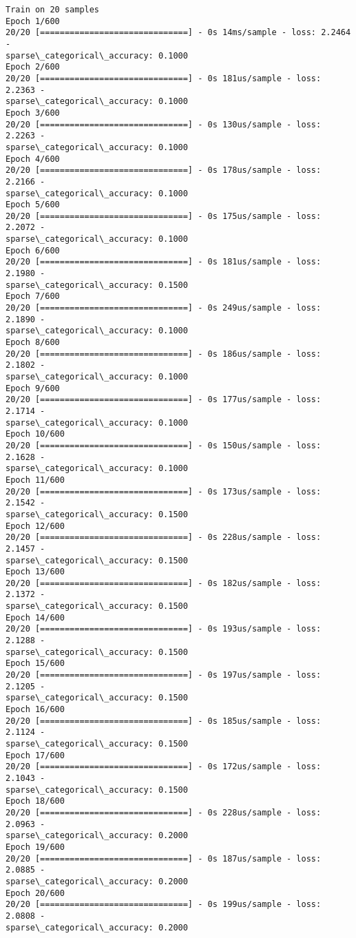 \documentclass[11pt]{article}
\begin{document}
    \begin{Verbatim}[commandchars=\\\{\}]
Train on 20 samples
Epoch 1/600
20/20 [==============================] - 0s 14ms/sample - loss: 2.2464 -
sparse\_categorical\_accuracy: 0.1000
Epoch 2/600
20/20 [==============================] - 0s 181us/sample - loss: 2.2363 -
sparse\_categorical\_accuracy: 0.1000
Epoch 3/600
20/20 [==============================] - 0s 130us/sample - loss: 2.2263 -
sparse\_categorical\_accuracy: 0.1000
Epoch 4/600
20/20 [==============================] - 0s 178us/sample - loss: 2.2166 -
sparse\_categorical\_accuracy: 0.1000
Epoch 5/600
20/20 [==============================] - 0s 175us/sample - loss: 2.2072 -
sparse\_categorical\_accuracy: 0.1000
Epoch 6/600
20/20 [==============================] - 0s 181us/sample - loss: 2.1980 -
sparse\_categorical\_accuracy: 0.1500
Epoch 7/600
20/20 [==============================] - 0s 249us/sample - loss: 2.1890 -
sparse\_categorical\_accuracy: 0.1000
Epoch 8/600
20/20 [==============================] - 0s 186us/sample - loss: 2.1802 -
sparse\_categorical\_accuracy: 0.1000
Epoch 9/600
20/20 [==============================] - 0s 177us/sample - loss: 2.1714 -
sparse\_categorical\_accuracy: 0.1000
Epoch 10/600
20/20 [==============================] - 0s 150us/sample - loss: 2.1628 -
sparse\_categorical\_accuracy: 0.1000
Epoch 11/600
20/20 [==============================] - 0s 173us/sample - loss: 2.1542 -
sparse\_categorical\_accuracy: 0.1500
Epoch 12/600
20/20 [==============================] - 0s 228us/sample - loss: 2.1457 -
sparse\_categorical\_accuracy: 0.1500
Epoch 13/600
20/20 [==============================] - 0s 182us/sample - loss: 2.1372 -
sparse\_categorical\_accuracy: 0.1500
Epoch 14/600
20/20 [==============================] - 0s 193us/sample - loss: 2.1288 -
sparse\_categorical\_accuracy: 0.1500
Epoch 15/600
20/20 [==============================] - 0s 197us/sample - loss: 2.1205 -
sparse\_categorical\_accuracy: 0.1500
Epoch 16/600
20/20 [==============================] - 0s 185us/sample - loss: 2.1124 -
sparse\_categorical\_accuracy: 0.1500
Epoch 17/600
20/20 [==============================] - 0s 172us/sample - loss: 2.1043 -
sparse\_categorical\_accuracy: 0.1500
Epoch 18/600
20/20 [==============================] - 0s 228us/sample - loss: 2.0963 -
sparse\_categorical\_accuracy: 0.2000
Epoch 19/600
20/20 [==============================] - 0s 187us/sample - loss: 2.0885 -
sparse\_categorical\_accuracy: 0.2000
Epoch 20/600
20/20 [==============================] - 0s 199us/sample - loss: 2.0808 -
sparse\_categorical\_accuracy: 0.2000

\end{Verbatim}
\end{document}
